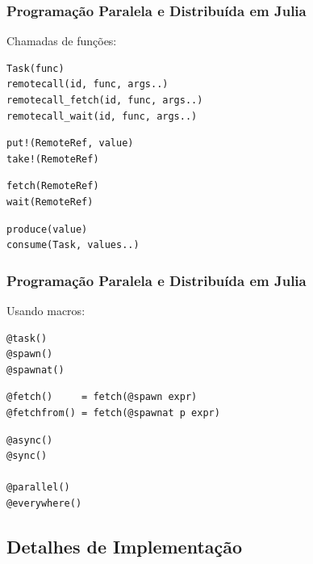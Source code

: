 \documentclass[10pt, compress]{beamer}
\begin{document}
\begin{frame}[fragile]
    \frametitle{Programação Paralela e Distribuída em Julia}
    Chamadas de funções:

    \begin{lstlisting}
Task(func)
remotecall(id, func, args..)
remotecall_fetch(id, func, args..)
remotecall_wait(id, func, args..)
    \end{lstlisting}
    \pause
    \begin{lstlisting}
put!(RemoteRef, value)
take!(RemoteRef)
    \end{lstlisting}
    \pause
    \begin{lstlisting}
fetch(RemoteRef)
wait(RemoteRef)
    \end{lstlisting}
    \pause
    \begin{lstlisting}
produce(value)
consume(Task, values..)
    \end{lstlisting}
    \let\thefootnote\relax{}
    \let\thefootnote\relax{}
\end{frame}

\begin{frame}[fragile]
    \frametitle{Programação Paralela e Distribuída em Julia}
    Usando macros:
    \begin{lstlisting}
@task()
@spawn()
@spawnat()
    \end{lstlisting}
    \pause
    \begin{lstlisting}
@fetch()     = fetch(@spawn expr)
@fetchfrom() = fetch(@spawnat p expr)
    \end{lstlisting}
    \pause
    \begin{lstlisting}
@async()
@sync()

@parallel()
@everywhere()
    \end{lstlisting}
    \let\thefootnote\relax{}
    \let\thefootnote\relax{}
\end{frame}

\subsection{Detalhes de Implementação}
\end{document}
